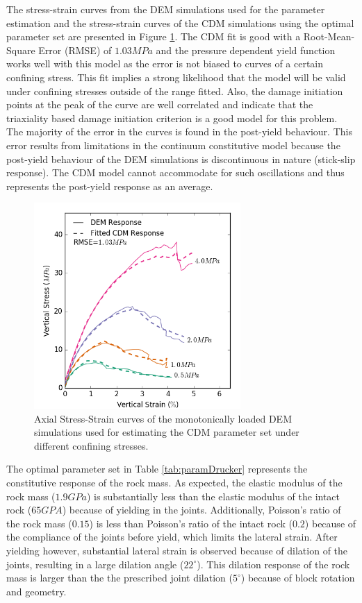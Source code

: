 The stress-strain curves from the DEM simulations used for the parameter estimation and the stress-strain curves of the CDM simulations using the optimal parameter set are presented in Figure \ref{fig:fitted1}. The CDM fit is good with a Root-Mean-Square Error (RMSE) of $1.03MPa$ and the pressure dependent yield function works well with this model as the error is not biased to curves of a certain confining stress. This fit implies a strong likelihood that the model will be valid under confining stresses outside of the range fitted. Also, the damage initiation points at the peak of the curve are well correlated and indicate that the triaxiality based damage initiation criterion is a good model for this problem. The majority of the error in the curves is found in the post-yield behaviour. This error results from limitations in the continuum constitutive model because the post-yield behaviour of the DEM simulations is discontinuous in nature (stick-slip response). The CDM model cannot accommodate for such oscillations and thus represents the post-yield response as an average. 

\begin{figure}[!htb]
\begin{center}
\includegraphics[width=0.7\textwidth]{figures/Chapter5/DruckerFittedCurves}
\caption{{\label{fig:fitted1} Axial Stress-Strain curves of the monotonically loaded DEM simulations used for estimating the CDM parameter set under different confining stresses.%
}}
\end{center}
\end{figure}

The optimal parameter set in Table \ref{tab:paramDrucker} represents the constitutive response of the rock mass. As expected, the elastic modulus of the rock mass ($1.9 GPa$) is substantially less than the elastic modulus of the intact rock ($65 GPA$) because of yielding in the joints. Additionally, Poisson's ratio of the rock mass ($0.15$) is less than Poisson's ratio of the intact rock ($0.2$) because of the compliance of the joints before yield, which limits the lateral strain. After yielding however, substantial lateral strain is observed because of dilation of the joints, resulting in a large dilation angle ($22^\circ$). This dilation response of the rock mass is larger than the the prescribed joint dilation ($5^\circ$) because of block rotation and geometry.

